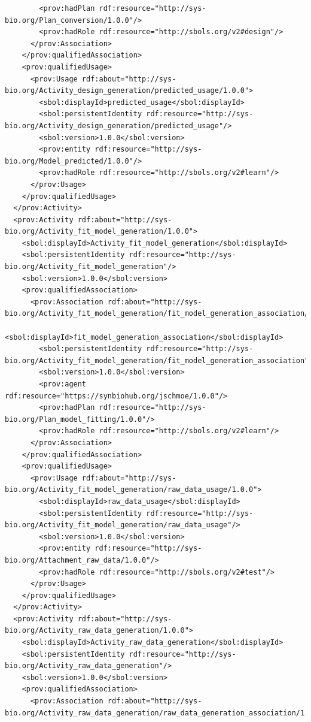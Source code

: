 \begin{lstlisting}
        <prov:hadPlan rdf:resource="http://sys-bio.org/Plan_conversion/1.0.0"/>
        <prov:hadRole rdf:resource="http://sbols.org/v2#design"/>
      </prov:Association>
    </prov:qualifiedAssociation>
    <prov:qualifiedUsage>
      <prov:Usage rdf:about="http://sys-bio.org/Activity_design_generation/predicted_usage/1.0.0">
        <sbol:displayId>predicted_usage</sbol:displayId>
        <sbol:persistentIdentity rdf:resource="http://sys-bio.org/Activity_design_generation/predicted_usage"/>
        <sbol:version>1.0.0</sbol:version>
        <prov:entity rdf:resource="http://sys-bio.org/Model_predicted/1.0.0"/>
        <prov:hadRole rdf:resource="http://sbols.org/v2#learn"/>
      </prov:Usage>
    </prov:qualifiedUsage>
  </prov:Activity>
  <prov:Activity rdf:about="http://sys-bio.org/Activity_fit_model_generation/1.0.0">
    <sbol:displayId>Activity_fit_model_generation</sbol:displayId>
    <sbol:persistentIdentity rdf:resource="http://sys-bio.org/Activity_fit_model_generation"/>
    <sbol:version>1.0.0</sbol:version>
    <prov:qualifiedAssociation>
      <prov:Association rdf:about="http://sys-bio.org/Activity_fit_model_generation/fit_model_generation_association/1.0.0">
        <sbol:displayId>fit_model_generation_association</sbol:displayId>
        <sbol:persistentIdentity rdf:resource="http://sys-bio.org/Activity_fit_model_generation/fit_model_generation_association"/>
        <sbol:version>1.0.0</sbol:version>
        <prov:agent rdf:resource="https://synbiohub.org/jschmoe/1.0.0"/>
        <prov:hadPlan rdf:resource="http://sys-bio.org/Plan_model_fitting/1.0.0"/>
        <prov:hadRole rdf:resource="http://sbols.org/v2#learn"/>
      </prov:Association>
    </prov:qualifiedAssociation>
    <prov:qualifiedUsage>
      <prov:Usage rdf:about="http://sys-bio.org/Activity_fit_model_generation/raw_data_usage/1.0.0">
        <sbol:displayId>raw_data_usage</sbol:displayId>
        <sbol:persistentIdentity rdf:resource="http://sys-bio.org/Activity_fit_model_generation/raw_data_usage"/>
        <sbol:version>1.0.0</sbol:version>
        <prov:entity rdf:resource="http://sys-bio.org/Attachment_raw_data/1.0.0"/>
        <prov:hadRole rdf:resource="http://sbols.org/v2#test"/>
      </prov:Usage>
    </prov:qualifiedUsage>
  </prov:Activity>
  <prov:Activity rdf:about="http://sys-bio.org/Activity_raw_data_generation/1.0.0">
    <sbol:displayId>Activity_raw_data_generation</sbol:displayId>
    <sbol:persistentIdentity rdf:resource="http://sys-bio.org/Activity_raw_data_generation"/>
    <sbol:version>1.0.0</sbol:version>
    <prov:qualifiedAssociation>
      <prov:Association rdf:about="http://sys-bio.org/Activity_raw_data_generation/raw_data_generation_association/1.0.0">

\end{lstlisting}
